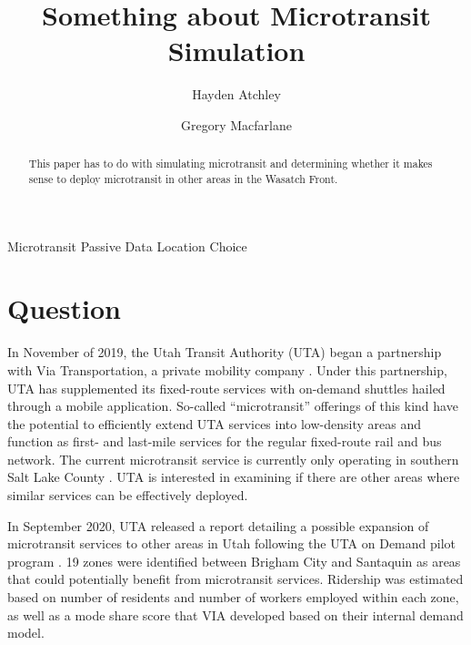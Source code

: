 \documentclass[3p, authoryear]{elsarticle} %
\begin{document}
\begin{frontmatter}

  \title{Something about Microtransit Simulation}
    \author[Brigham Young University]{Hayden Atchley}
    \author[Brigham Young University]{Gregory Macfarlane}
      \address[Brigham Young University]{Civil and Construction Engineering Department, 430 Engineering Building, Provo, Utah 84602}
    
  \begin{abstract}
  This paper has to do with simulating microtransit and determining whether it makes sense to deploy microtransit in other areas in the Wasatch Front.
  \end{abstract}
   \begin{keyword} Microtransit Passive Data Location Choice\end{keyword}
 \end{frontmatter}

\RaggedRight

\hypertarget{question}{%
\section{Question}\label{question}}

In November of 2019, the Utah Transit Authority (UTA) began a partnership with Via Transportation, a private mobility company \citep{UTAreport}.
Under this partnership, UTA has supplemented its fixed-route services with on-demand shuttles hailed through a mobile application.
So-called ``microtransit'' offerings of this kind have the potential to efficiently extend UTA services into low-density areas and function as first- and last-mile services for the regular fixed-route rail and bus network.
The current microtransit service is currently only operating in southern Salt Lake County \citep{UTAonDemand}.
UTA is interested in examining if there are other areas where similar services can be effectively deployed.

In September 2020, UTA released a report detailing a possible expansion of microtransit services to other areas in Utah following the UTA on Demand pilot program \citep{UTAreport}.
19 zones were identified between Brigham City and Santaquin as areas that could potentially benefit from microtransit services.
Ridership was estimated based on number of residents and number of workers employed within each zone, as well as a mode share score that VIA developed based on their internal demand model.
\end{document}
